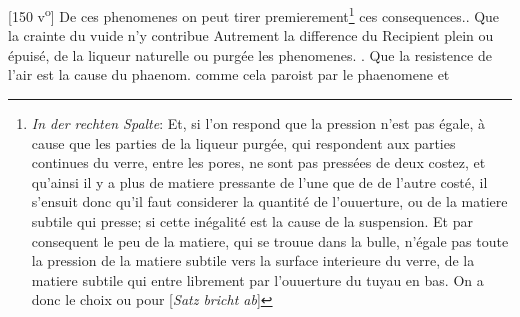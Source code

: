 [150 v\textsuperscript{o}] De ces phenomenes on peut tirer premierement\footnote{\textit{In der rechten Spalte}: Et, si l'on respond que la pression n'est pas \'{e}gale, \`{a} cause que les parties de la liqueur purg\'{e}e\protect{}, qui %
respondent aux parties continues du verre, entre les pores, ne sont pas press\'{e}es de deux costez, et qu'ainsi il y a plus de matiere pressante de l'une que de de l'autre cost\'{e}, il s'ensuit donc qu'il faut considerer la quantit\'{e} de l'ouuerture, ou de la matiere subtile\protect{} qui presse; si cette in\'{e}galit\'{e} est la cause de la suspension. Et par consequent le peu de la matiere, qui se trouue dans la bulle, n'\'{e}gale pas toute la pression de la matiere subtile vers la surface interieure du verre, de la matiere subtile qui entre librement par l'ouuerture du tuyau en bas. On a donc le choix ou pour [\textit{Satz bricht ab}]}
  ces consequences.\pend \clearpage\pstart {}. Que la crainte du vuide\protect{} n'y contribue %
Autrement la difference du Recipient plein ou \'{e}puis\'{e}, de la liqueur naturelle ou purg\'{e}e\protect{}  les phenomenes.\pend
\pstart {}. Que la resistence de l'air est la cause du phaenom.  comme cela paroist par le phaenomene  et \pend
